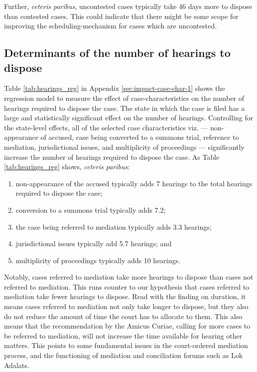 Further, \emph{ceteris paribus}, uncontested cases typically take 46 days more to dispose than contested cases. This could indicate that there might be some scope for improving the scheduling-mechanism for cases which are uncontested.

\subsection{Determinants of the number of hearings to dispose}
\label{sec:determ-numb-hear}

Table \ref{tab:hearings_reg} in Appendix \ref{sec:impact-case-char-1} shows the regression model to measure the effect of case-characteristics on the number of hearings required to dispose the case. The state in which the case is filed has a large and statistically significant effect on the number of hearings. Controlling for the state-level effects, all of the selected case characteristics viz. --- non-appearance of accused, case being converted to a summons trial, reference to mediation, jurisdictional issues, and multiplicity of proceedings --- significantly increase the number of hearings required to dispose the case. As Table \ref{tab:hearings_reg} shows, \emph{ceteris paribus}:
\begin{enumerate}
\item non-appearance of the accused typically adds 7 hearings to the total hearings required to dispose the case;
\item conversion to a summons trial typically adds 7.2;
\item the case being referred to mediation typically adds 3.3 hearings;
\item jurisdictional issues typically add 5.7 hearings; and
\item multiplicity of proceedings typically adds 10 hearings.
\end{enumerate}

Notably, cases referred to mediation take more hearings to dispose than cases not referred to mediation. This runs counter to our hypothesis that cases referred to mediation take fewer hearings to dispose. Read with the finding on duration, it means cases referred to mediation not only take longer to dispose, but they also do not reduce the amount of time the court has to allocate to them. This also means that the recommendation by the Amicus Curiae, calling for more cases to be referred to mediation, will not increase the time available for hearing other matters. This points to some fundamental issues in the court-ordered mediation process, and the functioning of mediation and conciliation forums such as Lok Adalats.

